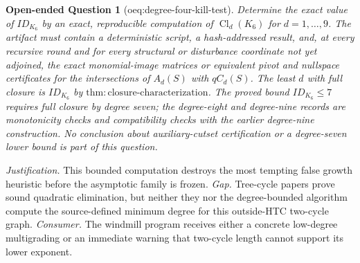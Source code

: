 \documentclass{article}
\newtheorem{openendedquestion}{Open-ended Question}
\begin{document}
\begin{openendedquestion}[oeq:degree-four-kill-test]\label{oeq:degree-four-kill-test}
Determine the exact value of \(ID_{K_6}\) by an exact, reproducible computation of \(\operatorname{Cl}_d(K_6)\) for \(d=1,\ldots,9\).  The artifact must contain a deterministic script, a hash-addressed result, and, at every recursive round and for every structural or disturbance coordinate not yet adjoined, the exact monomial-image matrices or equivalent pivot and nullspace certificates for the intersections of \(A_d(S)\) with \(qC_d(S)\).  The least \(d\) with full closure is \(ID_{K_6}\) by \(\mathrm{thm:closure\mbox{-}characterization}\).  The proved bound \(ID_{K_6}\leq7\) requires full closure by degree seven; the degree-eight and degree-nine records are monotonicity checks and compatibility checks with the earlier degree-nine construction.  No conclusion about auxiliary-cutset certification or a degree-seven lower bound is part of this question.
\end{openendedquestion}
\par\smallskip\noindent \textit{Justification.} This bounded computation destroys the most tempting false growth heuristic before the asymptotic family is frozen. \textit{Gap.} Tree-cycle papers prove sound quadratic elimination, but neither they nor the degree-bounded algorithm compute the source-defined minimum degree for this outside-HTC two-cycle graph. \textit{Consumer.} The windmill program receives either a concrete low-degree multigrading or an immediate warning that two-cycle length cannot support its lower exponent.
\end{document}
